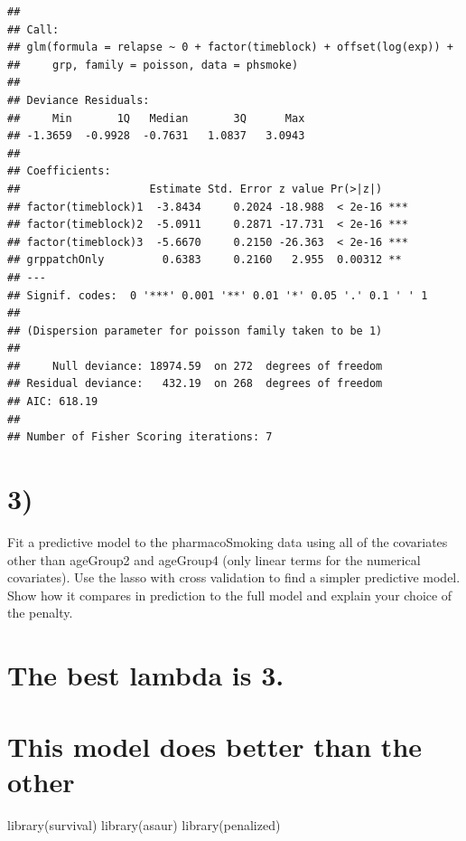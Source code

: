 \documentclass[
]{article}
\newenvironment{Shaded}{\begin{snugshade}}{\end{snugshade}}
\newcommand{\FunctionTok}[1]{\textcolor[rgb]{0.00,0.00,0.00}{#1}}
\newcommand{\NormalTok}[1]{#1}
\begin{document}
\begin{verbatim}
## 
## Call:
## glm(formula = relapse ~ 0 + factor(timeblock) + offset(log(exp)) + 
##     grp, family = poisson, data = phsmoke)
## 
## Deviance Residuals: 
##     Min       1Q   Median       3Q      Max  
## -1.3659  -0.9928  -0.7631   1.0837   3.0943  
## 
## Coefficients:
##                    Estimate Std. Error z value Pr(>|z|)    
## factor(timeblock)1  -3.8434     0.2024 -18.988  < 2e-16 ***
## factor(timeblock)2  -5.0911     0.2871 -17.731  < 2e-16 ***
## factor(timeblock)3  -5.6670     0.2150 -26.363  < 2e-16 ***
## grppatchOnly         0.6383     0.2160   2.955  0.00312 ** 
## ---
## Signif. codes:  0 '***' 0.001 '**' 0.01 '*' 0.05 '.' 0.1 ' ' 1
## 
## (Dispersion parameter for poisson family taken to be 1)
## 
##     Null deviance: 18974.59  on 272  degrees of freedom
## Residual deviance:   432.19  on 268  degrees of freedom
## AIC: 618.19
## 
## Number of Fisher Scoring iterations: 7
\end{verbatim}

\hypertarget{section-1}{%
\section{3)}\label{section-1}}

Fit a predictive model to the pharmacoSmoking data using all of the
covariates other than ageGroup2 and ageGroup4 (only linear terms for the
numerical covariates). Use the lasso with cross validation to find a
simpler predictive model. Show how it compares in prediction to the full
model and explain your choice of the penalty.

\hypertarget{the-best-lambda-is-3.}{%
\section{The best lambda is 3.}\label{the-best-lambda-is-3.}}

\hypertarget{this-model-does-better-than-the-other}{%
\section{This model does better than the
other}\label{this-model-does-better-than-the-other}}

\begin{Shaded}
\begin{Highlighting}[]
\FunctionTok{library}\NormalTok{(survival)}
\FunctionTok{library}\NormalTok{(asaur)}
\FunctionTok{library}\NormalTok{(penalized)}
\end{Highlighting}
\end{Shaded}
\end{document}
